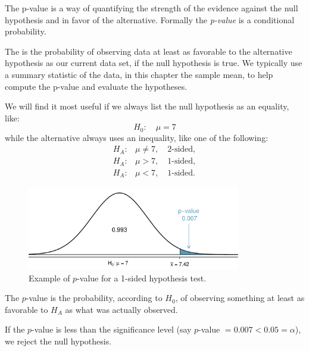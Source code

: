 
The p-value is a way of quantifying the strength of the evidence against the null hypothesis and in favor of the alternative. Formally the \emph{p-value} is a conditional probability.

\begin{termBox}{
The  is the probability of observing data at least as favorable to the alternative hypothesis as our current data set, if the null hypothesis is true. We typically use a summary statistic of the data, in this chapter the sample mean, to help compute the p-value and evaluate the hypotheses.}
\end{termBox}


\begin{tipBox}{
We will find it most useful if we always list the null hypothesis as an equality, like:
\[
H_0: \quad\mu = 7
\]
while the alternative always uses an inequality, like one of the following:
\begin{eqnarray*}
H_A:& \mu\neq7,\quad\text{2-sided},\\
H_A:& \mu>7,\quad\text{1-sided},\\
H_A:& \mu<7,\quad\text{1-sided}.
\end{eqnarray*}
}
\end{tipBox}

\begin{figure}%
   \centering
   \includegraphics[width=0.83\textwidth]{ch_inference_foundations/figures/pValueOneSidedSleepStudy/pValueOneSidedSleepStudy}
   \caption{Example of $p$-value for a 1-sided hypothesis test.}
   \label{pValueOneSidedSleepStudy}
\end{figure}

The $p$-value is the probability, according to $H_0$, of observing something at least as favorable to $H_A$ as what was actually observed.

If the $p$-value is less than the significance level (say $p$-value $=0.007 < 0.05=\alpha$), we reject the null hypothesis.

